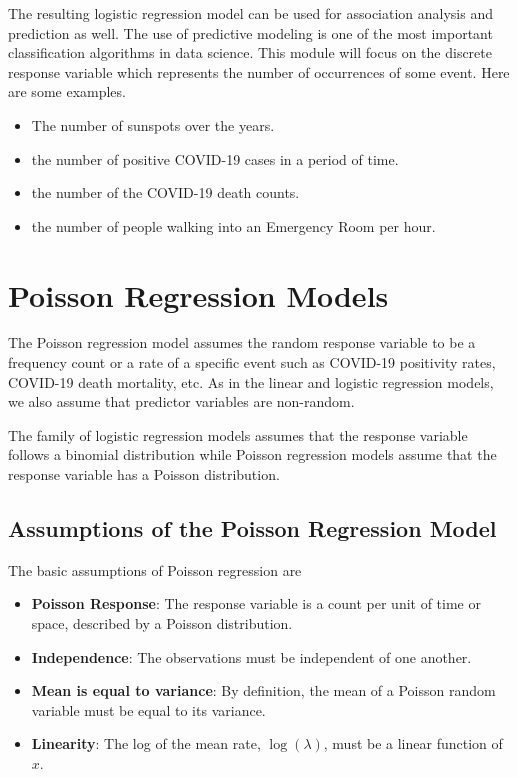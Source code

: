 \documentclass[
]{book}
\providecommand{\tightlist}{%
  \setlength{\itemsep}{0pt}\setlength{\parskip}{0pt}}
\begin{document}
The resulting logistic regression model can be used for association analysis and prediction as well. The use of predictive modeling is one of the most important classification algorithms in data science. This module will focus on the discrete response variable which represents the number of occurrences of some event. Here are some examples.

\begin{itemize}
\tightlist
\item
  The number of sunspots over the years.
\item
  the number of positive COVID-19 cases in a period of time.
\item
  the number of the COVID-19 death counts.
\item
  the number of people walking into an Emergency Room per hour.
\end{itemize}

\hypertarget{poisson-regression-models}{%
\section{Poisson Regression Models}\label{poisson-regression-models}}

The Poisson regression model assumes the random response variable to be a frequency count or a rate of a specific event such as COVID-19 positivity rates, COVID-19 death mortality, etc. As in the linear and logistic regression models, we also assume that predictor variables are non-random.

The family of logistic regression models assumes that the response variable follows a binomial distribution while Poisson regression models assume that the response variable has a Poisson distribution.

\hypertarget{assumptions-of-the-poisson-regression-model}{%
\subsection{Assumptions of the Poisson Regression Model}\label{assumptions-of-the-poisson-regression-model}}

The basic assumptions of Poisson regression are

\begin{itemize}
\item
  \textbf{Poisson Response}: The response variable is a count per unit of time or space, described by a Poisson distribution.
\item
  \textbf{Independence}: The observations must be independent of one another.
\item
  \textbf{Mean is equal to variance}: By definition, the mean of a Poisson random variable must be equal to its variance.
\item
  \textbf{Linearity}: The log of the mean rate, \(\log( \lambda)\), must be a linear function of \(x\).
\end{itemize}
\end{document}
